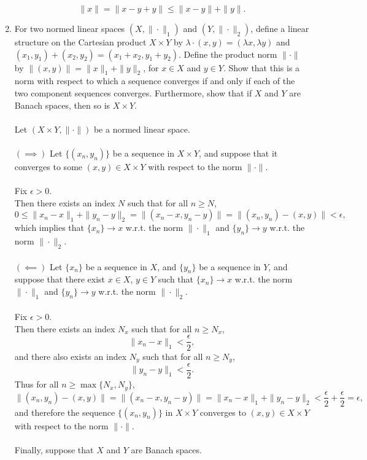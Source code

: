 \begin{enumerate}
    \[
        \|x\|=\|x-y+y\|\le\|x-y\|+\|y\|.
    \]
    \item For two normed linear spaces $(X,\|\cdot\|_1)$ and $(Y,\|\cdot\|_2)$, define a linear structure on the Cartesian product $X\times Y$ by $\lambda\cdot(x,y)=(\lambda x,\lambda y)$ and $(x_1,y_1)+(x_2,y_2)=(x_1+x_2,y_1+y_2)$.
    Define the product norm $\|\cdot\|$ by $\|(x,y)\|=\|x\|_1+\|y\|_2$, for $x\in X$ and $y\in Y$.
    Show that this is a norm with respect to which a sequence converges if and only if each of the two component sequences converges.
    Furthermore, show that if $X$ and $Y$ are Banach spaces, then so is $X\times Y$.\\
    \\Let $(X\times Y,\|\cdot\|)$ be a normed linear space.\\
    \\$(\implies)$ Let $\{(x_n,y_n)\}$ be a sequence in $X\times Y$, and suppose that it converges to some $(x,y)\in X\times Y$ with respect to the norm $\|\cdot\|$.\\
    \\Fix $\epsilon>0$.
    \\Then there exists an index $N$ such that for all $n\ge N$,
    \[
        0\le\|x_n-x\|_1+\|y_n-y\|_2=\|(x_n-x,y_n-y)\|=\|(x_n,y_n)-(x,y)\|<\epsilon,
    \]
    which implies that $\{x_n\}\to x$ w.r.t. the norm $\|\cdot\|_1$ and $\{y_n\}\to y$ w.r.t. the norm $\|\cdot\|_2$.\\
    \\$(\impliedby)$ Let $\{x_n\}$ be a sequence in $X$, and $\{y_n\}$ be a sequence in $Y$, and suppose that there exist $x\in X$, $y\in Y$ such that $\{x_n\}\to x$ w.r.t. the norm $\|\cdot\|_1$ and $\{y_n\}\to y$ w.r.t. the norm $\|\cdot\|_2$.\\
    \\Fix $\epsilon>0$.
    \\Then there exists an index $N_x$ such that for all $n\ge N_x$,
    \[
        \|x_n-x\|_1<\frac{\epsilon}{2},
    \]
    and there also exists an index $N_y$ such that for all $n\ge N_y$,
    \[
        \|y_n-y\|_1<\frac{\epsilon}{2}.
    \]
    Thus for all $n\ge\max\{N_x,N_y\}$,
    \[
        \|(x_n,y_n)-(x,y)\|=\|(x_n-x,y_n-y)\|=\|x_n-x\|_1+\|y_n-y\|_2<\frac{\epsilon}{2}+\frac{\epsilon}{2}=\epsilon,
    \]
    and therefore the sequence $\{(x_n,y_n)\}$ in $X\times Y$ converges to $(x,y)\in X\times Y$ with respect to the norm $\|\cdot\|$.\\
    \\Finally, suppose that $X$ and $Y$ are Banach spaces.

\end{enumerate}
